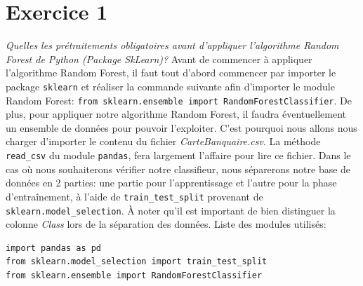 \documentclass[a4paper, 12pt, oneside]{book}
\begin{document}
\section{Exercice 1}
\textit{Quelles les prétraitements obligatoires avant d’appliquer l’algorithme Random Forest de Python (Package SkLearn)?}
\newline \newline
Avant de commencer à appliquer l'algorithme Random Forest, il faut tout d'abord commencer par importer le package \texttt{sklearn} et réaliser la commande suivante afin d'importer le module Random Forest: \texttt{from sklearn.ensemble import RandomForestClassifier}.
De plus, pour appliquer notre algorithme Random Forest, il faudra éventuellement un ensemble de données pour pouvoir l'exploiter. C'est pourquoi nous allons nous charger d'importer le contenu du fichier \textit{CarteBanquaire.csv}. La méthode \texttt{read\_csv} du module \texttt{pandas}, fera largement l'affaire pour lire ce fichier.
\newline
Dans le cas où nous souhaiterons vérifier notre classifieur, nous séparerons notre base de données en 2 parties: une partie pour l'apprentissage et l'autre pour la phase d'entraînement, à l'aide de \texttt{train\_test\_split} provenant de \texttt{sklearn.model\_selection}. À noter qu'il est important de bien distinguer la colonne \textit{Class} lors de la séparation des données.
\newline \newline
Liste des modules utilisés:
\begin{verbatim}
import pandas as pd
from sklearn.model_selection import train_test_split
from sklearn.ensemble import RandomForestClassifier
\end{verbatim}
\end{document}
